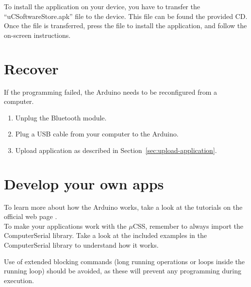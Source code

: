 	To install the application on your device, you have to transfer the ``uCSoftwareStore.apk'' file to the device. This file can be found the provided CD. Once the file is transferred, press the file to install the application, and follow the on-screen instructions.
	
	\section{Recover}
	If the programming failed, the Arduino needs to be reconfigured from a computer.\\
	
	\begin{enumerate}
	\item Unplug the Bluetooth module.
	
	\item Plug a USB cable from your computer to the Arduino.
	
	\item Upload application as described in Section~\ref{sec:upload-application}.
	\end{enumerate}
	
	
	\section{Develop your own apps}
	To learn more about how the Arduino works, take a look at the tutorials on the official web page \cite{arduino-tutorials}.\\
	
	To make your applications work with the $\mu$CSS, remember to always import the ComputerSerial library. Take a look at the included examples in the ComputerSerial library to understand how it works.
	
	Use of extended blocking commands (long running operations or loops inside the running loop) should be avoided, as these will prevent any programming during execution.